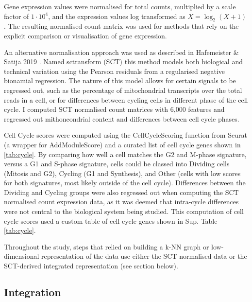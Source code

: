 Gene expression values were normalised for total counts, multiplied by a scale factor of  \(1\cdot10^4\), and the expression values log transformed as \(X = \log_2 (X+1)\). The resulting normalised count matrix was used for methods that rely on the explicit comparison or visualisation of gene expression.

An alternative normalisation approach was used as described in Hafemeister \& Satija 2019 \cite{hafemeister_normalization_2019}. Named sctransform (SCT) this method models both biological and technical variation using the Pearson residuals from a regularised negative bionamial regression. The nature of this model allows for certain signals to be regressed out, such as the percentage of mitochondrial transcripts over the total reads in a cell, or for differences between cycling cells in different phase of the cell cycle. I computed SCT normalised count matrices with 6,000 features and regressed out mithoncondrial content and differences between cell cycle phases.

Cell Cycle scores were computed using the CellCycleScoring function from Seurat (a wrapper for AddModuleScore) and a curated list of cell cycle genes shown in \ref{tab:cycle}. By comparing how well a cell matches the G2 and M-phase signature, versus a G1 and S-phase signature, cells could be classed into Dividing cells (Mitosis and G2), Cycling (G1 and Synthesis), and Other (cells with low scores for both signatures, most likely outside of the cell cycle). Differences between the Dividing and Cycling groups were also regressed out when computing the SCT normalised count expression data, as it was deemed that intra-cycle differences were not central to the biological system being studied. This computation of cell cycle scores used a custom table of cell cycle genes shown in Sup. Table \ref{tab:cycle}.

Throughout the study, steps that relied on building a k-NN graph or low-dimensional representation of the data use either the SCT normalised data or the SCT-derived integrated representation (see section below).

\subsection{Integration}


